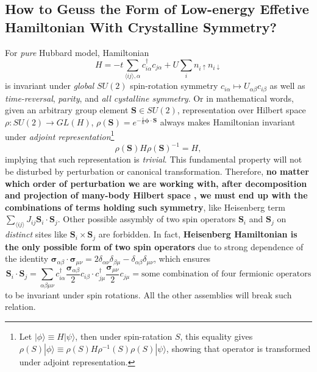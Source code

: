 \documentclass[10pt,nofootinbib]{revtex4}
\begin{document}
	\subsection{How to Geuss the Form of Low-energy Effetive Hamiltonian With Crystalline Symmetry?}
		For \emph{pure} Hubbard model, Hamiltonian
		\begin{equation*}
			H=-t\sum_{\langle ij \rangle,\alpha}c_{i \alpha}^\dagger c_{j \alpha}+U\sum_i n_{i\uparrow}n_{i\downarrow}
		\end{equation*}
		is invariant under \emph{global} $SU(2)$ spin-rotation symmetry $c_{i \alpha}\mapsto U_{\alpha \beta}c_{i \beta}$ as well as \emph{time-reversal}, \emph{parity}, and \emph{all cystalline symmetry}. Or in mathematical words, given an arbitrary group element  $\bm{S}\in SU(2)$, representation over Hilbert space $\rho:SU(2)\rightarrow GL(H)$, $\rho(\bm{S})=e^{-\frac i\hbar\bm{\phi}\cdot\bm{S}}$ always makes Hamiltonian invariant under \emph{adjoint representation}\footnote{Let $|\phi\rangle\equiv H|\psi\rangle$, then under spin-ratation $S$, this equality gives $\rho(S)|\phi\rangle\equiv\rho(S)H\rho^{-1}(S)\rho(S)|\psi\rangle$, showing that operator is transformed under adjoint representation.}
		\begin{equation*}
			\rho(\bm{S})H\rho(\bm{S})^{-1}=H,
		\end{equation*}
		implying that such representation is \emph{trivial}. This fundamental property will not be disturbed by perturbation or canonical transformation. Therefore, \textbf{no matter which order of perturbation we are working with, after decomposition and projection of many-body Hilbert space \cite{macdonald1988t,chernyshev2004higher}, we must end up with the combinations of terms holding such symmetry}, like Heisenberg term $\sum_{\langle ij \rangle }J_{ij}\bm{S}_i\cdot\bm{S}_j$. Other possible assymbly of two spin operators $\bm{S}_i$ and $\bm{S}_j$ on \emph{distinct} sites like $\bm{S}_i\times\bm{S}_j$ are forbidden. In fact, \textbf{Heisenberg Hamiltonian is the only possible form of two spin operators} due to strong dependence of the identity $\bm{\sigma}_{\alpha \beta}\cdot\bm{\sigma}_{\mu\nu}=2\delta_{\alpha\nu}\delta_{\beta\mu}-\delta_{\alpha \beta}\delta_{\mu\nu}$, which ensures
		\begin{equation*}
			\bm{S}_i\cdot\bm{S}_j=\sum_{\alpha \beta \mu \nu}c_{i \alpha}^\dagger\dfrac{\bm{\sigma}_{\alpha \beta}}{2}c_{i \beta}\cdot c_{j \mu}^\dagger\dfrac{\bm{\sigma}_{\mu\nu}}{2}c_{j \mu}=\text{some combination of four fermionic operators}
		\end{equation*}
		to be invariant under spin rotations. All the other assemblies will break such relation.
	
\end{document}
